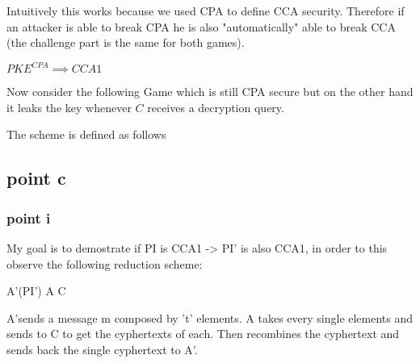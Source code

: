 \noindent Intuitively this works because we used CPA to define CCA security. Therefore if an attacker is able to break CPA he is also "automatically" able to break CCA (the challenge part is the same for both games).

\bigskip
$PKE^{CPA} \implies CCA1$

Now consider the following Game which is still CPA secure but on the other hand it leaks the key whenever $C$ receives a decryption query.

The scheme is defined as follows
\begin{figure}[h!]
    \centering
    \sdinit{}
\end{figure}

\newpage
\subsection{point c}
\subsubsection{point i}

My goal is to demostrate if PI is CCA1 -> PI' is also CCA1, in order to this observe the following reduction scheme:


A'(PI')  A  C


A'sends a message m composed by 't' elements. A takes every single elements and sends to C to get the cyphertexts of each.
Then recombines the cyphertext and sends back the single cyphertext to A'.

